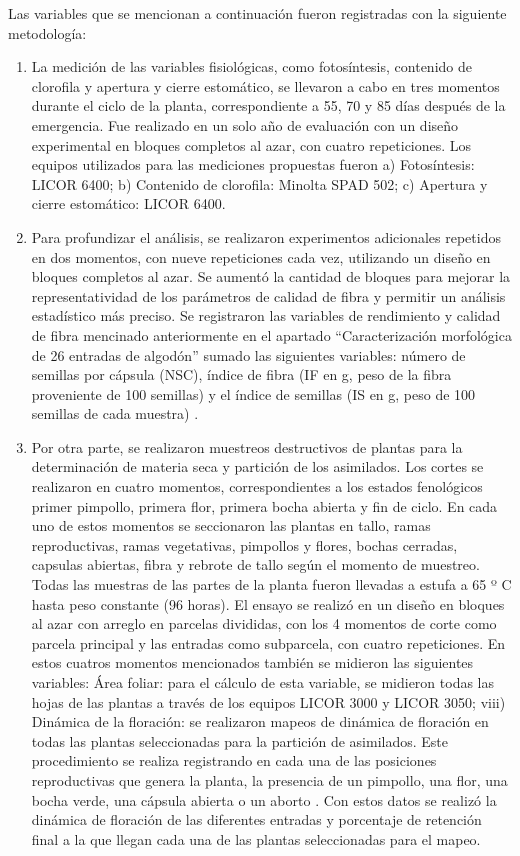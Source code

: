 \documentclass[12pt,oneside]{reedthesis}
\begin{document}
Las variables que se mencionan a continuación fueron registradas con la siguiente metodología:

\begin{enumerate}
\def\labelenumi{\roman{enumi})}
\item
  La medición de las variables fisiológicas, como fotosíntesis, contenido de clorofila y apertura y cierre estomático, se llevaron a cabo en tres momentos durante el ciclo de la planta, correspondiente a 55, 70 y 85 días después de la emergencia. Fue realizado en un solo año de evaluación con un diseño experimental en bloques completos al azar, con cuatro repeticiones. Los equipos utilizados para las mediciones propuestas fueron a) Fotosíntesis: LICOR 6400; b) Contenido de clorofila: Minolta SPAD 502; c) Apertura y cierre estomático: LICOR 6400.
\item
  Para profundizar el análisis, se realizaron experimentos adicionales repetidos en dos momentos, con nueve repeticiones cada vez, utilizando un diseño en bloques completos al azar. Se aumentó la cantidad de bloques para mejorar la representatividad de los parámetros de calidad de fibra y permitir un análisis estadístico más preciso. Se registraron las variables de rendimiento y calidad de fibra mencinado anteriormente en el apartado ``Caracterización morfológica de 26 entradas de algodón'' sumado las siguientes variables: número de semillas por cápsula (NSC)\autocite{worley1974}, índice de fibra (IF en g, peso de la fibra proveniente de 100 semillas) y el índice de semillas (IS en g, peso de 100 semillas de cada muestra) \autocite{pettigrew2013}.
\item
  Por otra parte, se realizaron muestreos destructivos de plantas para la determinación de materia seca y partición de los asimilados. Los cortes se realizaron en cuatro momentos, correspondientes a los estados fenológicos primer pimpollo, primera flor, primera bocha abierta y fin de ciclo. En cada uno de estos momentos se seccionaron las plantas en tallo, ramas reproductivas, ramas vegetativas, pimpollos y flores, bochas cerradas, capsulas abiertas, fibra y rebrote de tallo según el momento de muestreo. Todas las muestras de las partes de la planta fueron llevadas a estufa a 65 º C hasta peso constante (96 horas). El ensayo se realizó en un diseño en bloques al azar con arreglo en parcelas divididas, con los 4 momentos de corte como parcela principal y las entradas como subparcela, con cuatro repeticiones. En estos cuatros momentos mencionados también se midieron las siguientes variables: Área foliar: para el cálculo de esta variable, se midieron todas las hojas de las plantas a través de los equipos LICOR 3000 y LICOR 3050; viii) Dinámica de la floración: se realizaron mapeos de dinámica de floración en todas las plantas seleccionadas para la partición de asimilados. Este procedimiento se realiza registrando en cada una de las posiciones reproductivas que genera la planta, la presencia de un pimpollo, una flor, una bocha verde, una cápsula abierta o un aborto \autocite{kerby1996monitoring}. Con estos datos se realizó la dinámica de floración de las diferentes entradas y porcentaje de retención final a la que llegan cada una de las plantas seleccionadas para el mapeo.
\end{enumerate}
\end{document}
